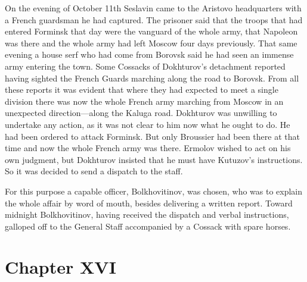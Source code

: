On the evening of October 11th Seslavin came to the Aristovo
headquarters with a French guardsman he had captured. The
prisoner said that the troops that had entered Forminsk that day
were the vanguard of the whole army, that Napoleon was there and
the whole army had left Moscow four days previously. That same
evening a house serf who had come from Borovsk said he had seen
an immense army entering the town. Some Cossacks of Dokhturov's
detachment reported having sighted the French Guards marching
along the road to Borovsk. From all these reports it was evident
that where they had expected to meet a single division there was
now the whole French army marching from Moscow in an unexpected
direction---along the Kaluga road. Dokhturov was unwilling to
undertake any action, as it was not clear to him now what he
ought to do. He had been ordered to attack Forminsk. But only
Broussier had been there at that time and now the whole French
army was there. Ermolov wished to act on his own judgment, but
Dokhturov insisted that he must have Kutuzov's instructions. So
it was decided to send a dispatch to the staff.

For this purpose a capable officer, Bolkhovitinov, was chosen,
who was to explain the whole affair by word of mouth, besides
delivering a written report. Toward midnight Bolkhovitinov,
having received the dispatch and verbal instructions, galloped
off to the General Staff accompanied by a Cossack with spare
horses.


\chapter*{Chapter XVI} \ifaudio {}
\fi

